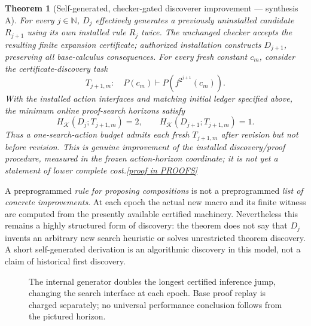\documentclass[11pt,letterpaper]{article}
\newtheorem{theorem}{Theorem}[section]
\theoremstyle{definition}
\theoremstyle{remark}
\newcommand{\K}{\mathcal K}
\newcommand{\prooflink}[1]{\hfill\hyperlink{proof:#1}{\footnotesize[proof in PROOFS]}}
\begin{document}
\begin{theorem}[Self-generated, checker-gated discoverer improvement --- synthesis A]\label{thm:ladder}\hypertarget{claim:ladder}{}
For every $j\in\mathbb N$, $D_j$ effectively generates a previously uninstalled candidate $R_{j+1}$ using its own installed rule $R_j$ twice. The unchanged checker accepts the resulting finite expansion certificate; authorized installation constructs $D_{j+1}$, preserving all base-calculus consequences. For every fresh constant $c_m$, consider the certificate-discovery task
\[
 T_{j+1,m}:\quad P(c_m)\vdash P(f^{2^{j+1}}(c_m)).
\]
With the installed action interfaces and matching initial ledger specified above, the minimum \emph{online} proof-search horizons satisfy
\[
 H_{\K}(D_j;T_{j+1,m})=2,\qquad H_{\K}(D_{j+1};T_{j+1,m})=1.
\]
Thus a one-search-action budget admits each fresh $T_{j+1,m}$ after revision but not before revision. This is genuine improvement of the installed discovery/proof procedure, measured in the frozen action-horizon coordinate; it is \emph{not yet} a statement of lower complete cost.\prooflink{ladder}
\end{theorem}

A preprogrammed \emph{rule for proposing compositions} is not a preprogrammed \emph{list of concrete improvements}. At each epoch the actual new macro and its finite witness are computed from the presently available certified machinery. Nevertheless this remains a highly structured form of discovery: the theorem does not say that $D_j$ invents an arbitrary new search heuristic or solves unrestricted theorem discovery. A short self-generated derivation is an algorithmic discovery in this model, not a claim of historical first discovery.

\begin{figure}[htbp]\centering
{}
\caption{The internal generator doubles the longest certified inference jump, changing the search interface at each epoch. Base proof replay is charged separately; no universal performance conclusion follows from the pictured horizon.}
\end{figure}
\end{document}
